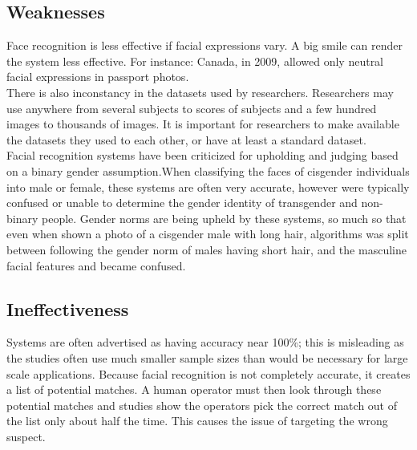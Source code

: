 \documentclass[12pt,letterpaper, onecolumn]{exam}
\begin{document}
    \subsection{Weaknesses}
    Face recognition is less effective if facial expressions vary. A big smile can render the system less effective. For instance: Canada, in 2009, allowed only neutral facial expressions in passport photos.\\
    There is also inconstancy in the datasets used by researchers. Researchers may use anywhere from several subjects to scores of subjects and a few hundred images to thousands of images. It is important for researchers to make available the datasets they used to each other, or have at least a standard dataset.\\
    Facial recognition systems have been criticized for upholding and judging based on a binary gender assumption.When classifying the faces of cisgender individuals into male or female, these systems are often very accurate, however were typically confused or unable to determine the gender identity of transgender and non-binary people. Gender norms are being upheld by these systems, so much so that even when shown a photo of a cisgender male with long hair, algorithms was split between following the gender norm of males having short hair, and the masculine facial features and became confused.
    
    \subsection{Ineffectiveness}
    Systems are often advertised as having accuracy near 100\%; this is misleading as the studies often use much smaller sample sizes than would be necessary for large scale applications. Because facial recognition is not completely accurate, it creates a list of potential matches. A human operator must then look through these potential matches and studies show the operators pick the correct match out of the list only about half the time. This causes the issue of targeting the wrong suspect.

    
\end{document}
